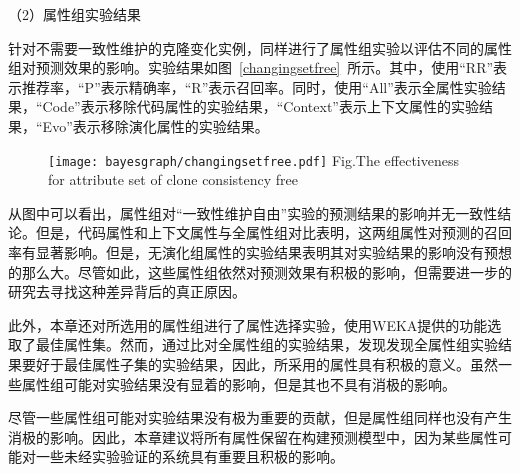 （2）属性组实验结果

针对不需要一致性维护的克隆变化实例，同样进行了属性组实验以评估不同的属性组对预测效果的影响。实验结果如图~\ref{changingsetfree}~所示。其中，使用“RR”表示推荐率，“P”表示精确率，“R”表示召回率。同时，使用“All”表示全属性实验结果，“Code”表示移除代码属性的实验结果，“Context”表示上下文属性的实验结果，“Evo”表示移除演化属性的实验结果。

\begin{figure}[h]
\centering
\texttt{[image: bayesgraph/changingsetfree.pdf]}
{Fig.$\!$}{The effectiveness for attribute set of clone consistency free}
\vspace{-1em}
\end{figure}

从图中可以看出，属性组对“一致性维护自由”实验的预测结果的影响并无一致性结论。但是，代码属性和上下文属性与全属性组对比表明，这两组属性对预测的召回率有显著影响。但是，无演化组属性的实验结果表明其对实验结果的影响没有预想的那么大。尽管如此，这些属性组依然对预测效果有积极的影响，但需要进一步的研究去寻找这种差异背后的真正原因。

此外，本章还对所选用的属性组进行了属性选择实验，使用WEKA提供的功能选取了最佳属性集。然而，通过比对全属性组的实验结果，发现发现全属性组实验结果要好于最佳属性子集的实验结果，因此，所采用的属性具有积极的意义。虽然一些属性组可能对实验结果没有显着的影响，但是其也不具有消极的影响。

尽管一些属性组可能对实验结果没有极为重要的贡献，但是属性组同样也没有产生消极的影响。因此，本章建议将所有属性保留在构建预测模型中，因为某些属性可能对一些未经实验验证的系统具有重要且积极的影响。

